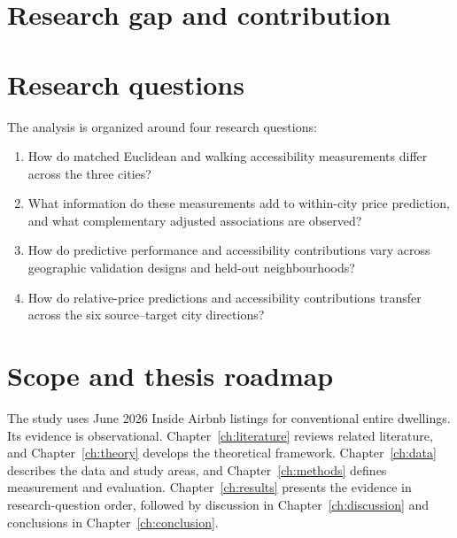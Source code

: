 \documentclass[11pt,a4paper,oneside,openany]{memoir}
\begin{document}
\section{Research gap and contribution}
\label{sec:gap}

\section{Research questions}
\label{sec:research-questions}
The analysis is organized around four research questions:
\begin{enumerate}
  \item[RQ1.] How do matched Euclidean and walking accessibility measurements
  differ across the three cities?
  \item[RQ2.] What information do these measurements add to within-city price
  prediction, and what complementary adjusted associations are observed?
  \item[RQ3.] How do predictive performance and accessibility contributions
  vary across geographic validation designs and held-out neighbourhoods?
  \item[RQ4.] How do relative-price predictions and accessibility contributions
  transfer across the six source--target city directions?
\end{enumerate}

\section{Scope and thesis roadmap}
\label{sec:roadmap}
The study uses June 2026 Inside Airbnb listings for conventional entire
dwellings. Its evidence is observational. Chapter~\ref{ch:literature} reviews
related literature, and Chapter~\ref{ch:theory} develops the theoretical
framework. Chapter~\ref{ch:data} describes the data and study areas, and
Chapter~\ref{ch:methods} defines measurement and evaluation.
Chapter~\ref{ch:results} presents the evidence in research-question order,
followed by discussion in Chapter~\ref{ch:discussion} and conclusions in
Chapter~\ref{ch:conclusion}.

\end{document}
